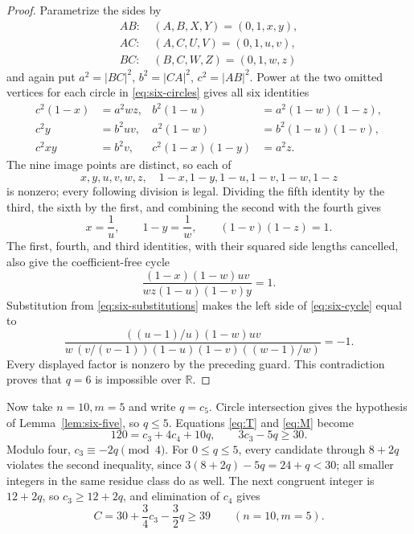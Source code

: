 \documentclass[11pt]{article}
\theoremstyle{definition}
\theoremstyle{remark}
\newcommand{\R}{\mathbb R}
\begin{document}
\begin{proof}
Parametrize the sides by
\[
\begin{aligned}
 AB:&\ (A,B,X,Y)=(0,1,x,y),\\
 AC:&\ (A,C,U,V)=(0,1,u,v),\\
 BC:&\ (B,C,W,Z)=(0,1,w,z)
\end{aligned}
\]
and again put \(a^2=|BC|^2\), \(b^2=|CA|^2\), \(c^2=|AB|^2\).
Power at the two omitted vertices for each circle in
\eqref{eq:six-circles} gives all six identities
\begin{align}
 c^2(1-x)&=a^2wz,&
 b^2(1-u)&=a^2(1-w)(1-z),\label{eq:six-power-a}\\
 c^2y&=b^2uv,&
 a^2(1-w)&=b^2(1-u)(1-v),\label{eq:six-power-b}\\
 c^2xy&=b^2v,&
 c^2(1-x)(1-y)&=a^2z.\label{eq:six-power-c}
\end{align}
The nine image points are distinct, so each of
\[
 x,y,u,v,w,z,\quad1-x,1-y,1-u,1-v,1-w,1-z
\]
is nonzero; every following division is legal.  Dividing the fifth identity
by the third, the sixth by the first, and combining the second with the
fourth gives
\begin{equation}\label{eq:six-substitutions}
 x=\frac1u,\qquad1-y=\frac1w,\qquad
 (1-v)(1-z)=1.
\end{equation}
The first, fourth, and third identities, with their squared side lengths
cancelled, also give the coefficient-free cycle
\begin{equation}\label{eq:six-cycle}
 \frac{(1-x)(1-w)uv}{wz(1-u)(1-v)y}=1.
\end{equation}
Substitution from \eqref{eq:six-substitutions} makes the left side of
\eqref{eq:six-cycle} equal to
\[
 \frac{((u-1)/u)(1-w)uv}
 {w\,(v/(v-1))(1-u)(1-v)((w-1)/w)}=-1.
\]
Every displayed factor is nonzero by the preceding guard.  This
contradiction proves that \(q=6\) is impossible over \(\R\).
\end{proof}

Now take \(n=10,m=5\) and write \(q=c_5\).  Circle intersection gives the
hypothesis of Lemma~\ref{lem:six-five}, so \(q\leq5\).  Equations
\eqref{eq:T} and \eqref{eq:M} become
\begin{equation}\label{eq:n10-arithmetic}
 120=c_3+4c_4+10q,\qquad3c_3-5q\geq30.
\end{equation}
Modulo four, \(c_3\equiv-2q\pmod4\).  For \(0\leq q\leq5\), every candidate
through \(8+2q\) violates the second inequality, since
\(3(8+2q)-5q=24+q<30\); all smaller integers in the same residue class do
as well.  The next congruent integer is \(12+2q\), so
\(c_3\geq12+2q\), and elimination of \(c_4\) gives
\begin{equation}\label{eq:n10-39}
 C=30+\frac34c_3-\frac32q\geq39
 \qquad(n=10,m=5).
\end{equation}
\end{document}
